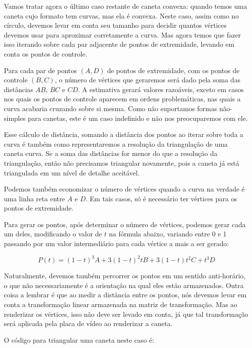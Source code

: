 {{{{{{Vamos tratar agora o último caso restante de caneta convexa: quando
temos uma caneta cujo formato tem curvas, mas ela é convexa. Neste
caso, assim como no círculo, devemos levar em conta seu tamanho para
decidir quantos vértices devemos usar para aproximar corretamente a
curva. Mas agora temos que fazer isso iterando sobre cada par
adjacente de pontos de extremidade, levando em conta os pontos de
controle.

Para cada par de pontos $(A, D)$ de pontos de extremidade, com os
pontos de controle $(B, C)$, o número de vértices que geraremos será
dado pela soma das distâncias $AB$, $BC$ e $CD$. A estimativa gerará
valores razoáveis, exceto em casos nos quais os pontos de controle
aparecem em ordens problemáticas, nas quais a curva acabaria cruzando
sobre si mesma. Como não suportamos formas não-simples para canetas,
este é um caso indefinido e não nos preocuparemos com ele.

Esse cálculo de distância, somando a distância dos pontos ao iterar
sobre toda a curva é também como representaremos a resolução da
triangulação de uma caneta curva. Se a soma das distâncias for menor
do que a resolução da triangulação, então não precisamos triangular
novamente, pois a caneta já está triangulada em um nível de detalhe
aceitável.

Podemos também economizar o número de vértices quando a curva na
verdade é uma linha reta entre $A$ e $D$. Em tais casos, só é
necessário ter vértices para os pontos de extremidade.

Para gerar os pontos, após determinar o número de vértices, podemos
gerar cada um deles, modificando o valor de $t$ na fórmula abaixo,
variando entre 0 e 1 passando por um valor intermediário para cada
vértice a mais a ser gerado:

$$
P(t) = (1-t)^3A + 3(1-t)^2tB + 3(1-t)t^2C + t^3D
$$

Naturalmente, devemos também percorrer os pontos em um sentido
anti-horário, o que não necessariamente é a orientação na qual eles
estão armazenados. Outra coisa a lembrar é que ao medir a distância
entre os pontos, nós devemos levar em conta a transformação linear
armazenada na matriz de transformação. Mas ao renderizar os vértices,
isso não deve ser levado em conta, já que tal transformação será
aplicada pela placa de vídeo ao renderizar a caneta.

O código para triangular uma caneta neste caso é:

}}}}}}
